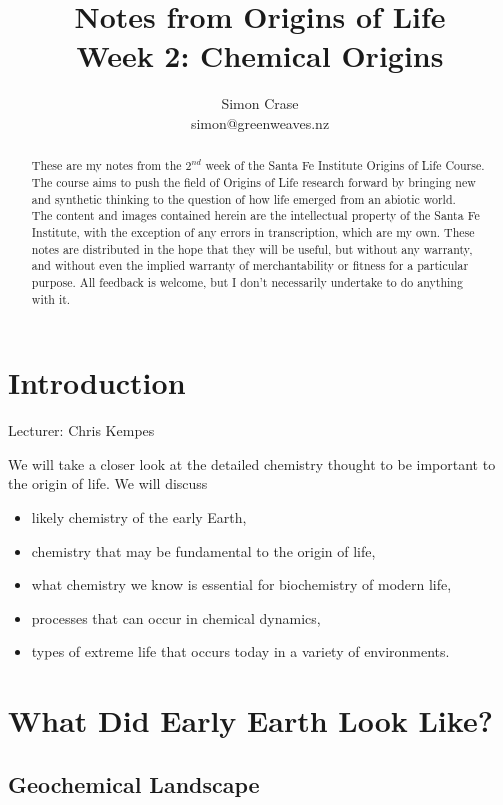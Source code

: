 \documentclass[]{article}
\title{
	Notes from Origins of Life\\
	Week 2: Chemical Origins
}
\author{Simon Crase\\simon@greenweaves.nz}
\begin{document}
\maketitle

\begin{abstract}
   These are my notes from the $2^{nd}$ week of the Santa Fe Institute Origins of Life Course\cite{sfi2019}. The course aims to push the field of Origins of Life research forward by bringing new and synthetic thinking to the question of how life emerged from an abiotic world.\\
   The content and images contained herein are the intellectual property of the Santa Fe Institute, with the exception of any errors in transcription, which are my own.
   These notes are distributed in the hope that they will be useful,
   but without any warranty, and without even the implied warranty of
   merchantability or fitness for a particular purpose. All feedback is welcome,
   but I don't necessarily undertake to do anything with it.

\end{abstract}

\setcounter{tocdepth}{2}
\tableofcontents
\listoffigures

\section{Introduction}

Lecturer: Chris Kempes

We will take a closer look at the detailed chemistry thought to be important to the origin of life. We will discuss
\begin{itemize}
	\item likely chemistry of the early Earth,
	\item chemistry that may be  fundamental to the origin of life,
	\item what chemistry we know is essential for biochemistry of modern life,
	\item processes that can occur in chemical dynamics, 
	\item types of extreme life that occurs today in a variety of environments.
\end{itemize}


\section{What Did Early Earth Look Like?}

\subsection{Geochemical Landscape}
\end{document}

